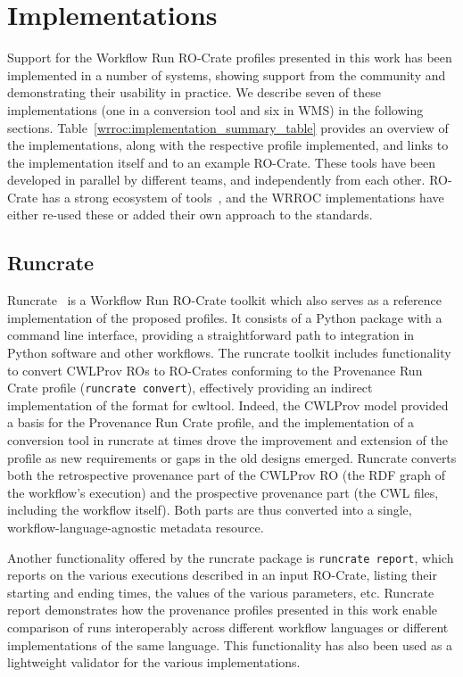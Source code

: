 \section{Implementations}\label{wrroc:implementations}

Support for the Workflow Run RO-Crate profiles presented in this work has been implemented in a number of systems, showing support from the community and demonstrating their usability in practice.
We describe seven of these implementations (one in a conversion tool and six in WMS) in the following sections.
Table~\ref{wrroc:implementation_summary_table} provides an overview of the implementations, along with the respective profile implemented, and links to the implementation itself and to an example RO-Crate.
%
These tools have been developed in parallel by different teams, and independently from each other.
RO-Crate has a strong ecosystem of tools~\cite{Soiland-Reyes 2022a}, and the WRROC implementations have either re-used these or added their own approach to the standards.


\subsection{Runcrate}\label{wrroc:runcrate}

Runcrate~\cite{runcrate} is a Workflow Run RO-Crate toolkit which also serves as a reference implementation of the proposed profiles.
It consists of a Python package with a command line interface, providing a straightforward path to integration in Python software and other workflows.
The runcrate toolkit includes functionality to convert CWLProv ROs to RO-Crates conforming to the Provenance Run Crate profile (\texttt{runcrate convert}), effectively providing an indirect implementation of the format for cwltool.
Indeed, the CWLProv model provided a basis for the Provenance Run Crate profile, and the implementation of a conversion tool in runcrate at times drove the improvement and extension of the profile as new requirements or gaps in the old designs emerged.
Runcrate converts both the retrospective provenance part of the CWLProv RO (the RDF graph of the workflow's execution) and the prospective provenance part (the CWL files, including the workflow itself).
Both parts are thus converted into a single, workflow-language-agnostic metadata resource.

Another functionality offered by the runcrate package is \texttt{runcrate report}, which reports on the various executions described in an input RO-Crate, listing their starting and ending times, the values of the various parameters, etc.
Runcrate report demonstrates how the provenance profiles presented in this work enable comparison of runs interoperably across different workflow languages or different implementations of the same language.
This functionality has also been used as a lightweight validator for the various implementations.

